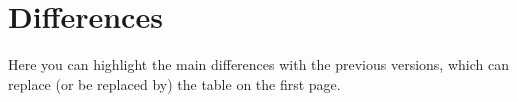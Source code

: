 \section{Differences}
Here you can highlight the main differences with the 
previous versions, which can replace (or be replaced by) 
the table on the 
first page.
